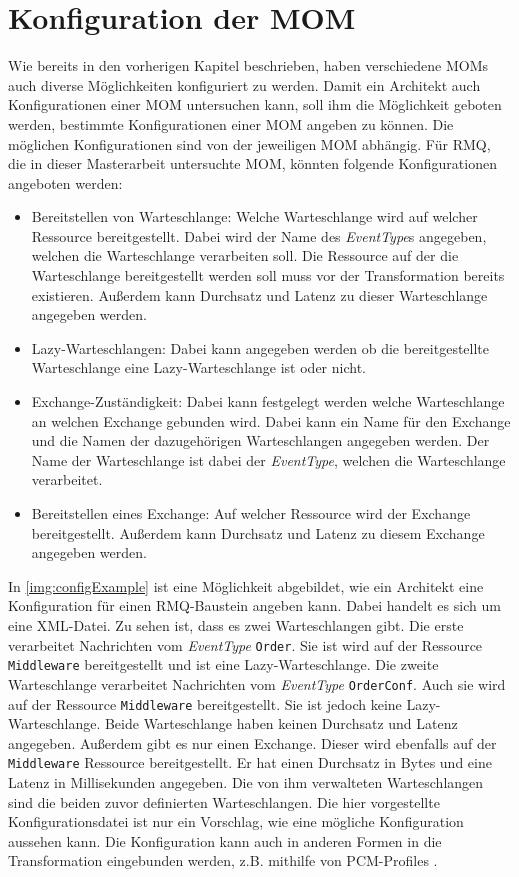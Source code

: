 \section{Konfiguration der MOM}
Wie bereits in den vorherigen Kapitel beschrieben, haben verschiedene MOMs auch diverse Möglichkeiten konfiguriert zu werden. Damit ein Architekt auch Konfigurationen einer MOM untersuchen kann, soll ihm die Möglichkeit geboten werden, bestimmte Konfigurationen einer MOM angeben zu können. Die möglichen Konfigurationen sind von der jeweiligen MOM abhängig. Für RMQ, die in dieser Masterarbeit untersuchte MOM, könnten folgende Konfigurationen angeboten werden:
\begin{itemize}
    \item Bereitstellen von Warteschlange: Welche Warteschlange wird auf welcher Ressource bereitgestellt. Dabei wird der Name des \emph{EventType}s angegeben, welchen die Warteschlange verarbeiten soll. Die Ressource auf der die Warteschlange bereitgestellt werden soll muss vor der Transformation bereits existieren. Außerdem kann Durchsatz und Latenz zu dieser Warteschlange angegeben werden.
    \item Lazy-Warteschlangen: Dabei kann angegeben werden ob die bereitgestellte Warteschlange eine Lazy-Warteschlange ist oder nicht. 
    \item Exchange-Zuständigkeit: Dabei kann festgelegt werden welche Warteschlange an welchen Exchange gebunden wird. Dabei kann ein Name für den Exchange und die Namen der dazugehörigen Warteschlangen angegeben werden. Der Name der Warteschlange ist dabei der \emph{EventType}, welchen die Warteschlange verarbeitet.
    \item Bereitstellen eines Exchange: Auf welcher Ressource wird der Exchange bereitgestellt. Außerdem kann Durchsatz und Latenz zu diesem Exchange angegeben werden.
\end{itemize}
In \autoref{img:configExample} ist eine Möglichkeit abgebildet, wie ein Architekt eine Konfiguration für einen RMQ-Baustein angeben kann. Dabei handelt es sich um eine XML-Datei. Zu sehen ist, dass es zwei Warteschlangen gibt. Die erste verarbeitet Nachrichten vom \emph{EventType} \texttt{Order}. Sie ist wird auf der Ressource \texttt{Middleware} bereitgestellt und ist eine Lazy-Warteschlange. Die zweite Warteschlange verarbeitet Nachrichten vom \emph{EventType} \texttt{OrderConf}. Auch sie wird auf der Ressource \texttt{Middleware} bereitgestellt. Sie ist jedoch keine Lazy-Warteschlange. Beide Warteschlange haben keinen Durchsatz und Latenz angegeben. Außerdem gibt es nur einen Exchange. Dieser wird ebenfalls auf der \texttt{Middleware} Ressource bereitgestellt. Er hat einen Durchsatz in Bytes und eine Latenz in Millisekunden angegeben. Die von ihm verwalteten Warteschlangen sind die beiden zuvor definierten Warteschlangen. Die hier vorgestellte Konfigurationsdatei ist nur ein Vorschlag, wie eine mögliche Konfiguration aussehen kann. Die Konfiguration kann auch in anderen Formen in die Transformation eingebunden werden, z.B. mithilfe von PCM-Profiles \cite{kramer2012b}.




